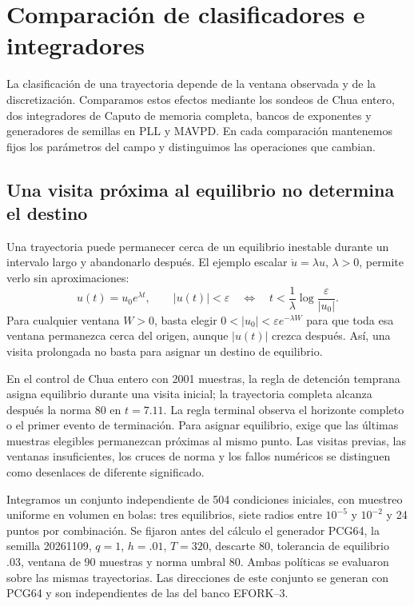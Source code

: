 \section{Comparación de clasificadores e integradores}
\label{sec:correcciones-noviembre}

La clasificación de una trayectoria depende de la ventana observada y de la
discretización. Comparamos estos efectos mediante los sondeos de Chua
entero, dos integradores de Caputo de memoria completa, bancos de exponentes
y generadores de semillas en PLL y MAVPD. En cada comparación mantenemos
fijos los parámetros del campo y distinguimos las operaciones que cambian.

\subsection{Una visita próxima al equilibrio no determina el destino}

Una trayectoria puede permanecer cerca de un equilibrio inestable durante
un intervalo largo y abandonarlo después. El ejemplo escalar
\(\dot u=\lambda u\), \(\lambda>0\), permite verlo sin aproximaciones:
\[
 u(t)=u_0e^{\lambda t},\qquad
 |u(t)|<\varepsilon
 \quad\Longleftrightarrow\quad
 t<\frac1\lambda\log\frac{\varepsilon}{|u_0|}.
\]
Para cualquier ventana \(W>0\), basta elegir
\(0<|u_0|<\varepsilon e^{-\lambda W}\) para que toda esa ventana permanezca
cerca del origen, aunque \(|u(t)|\) crezca después. Así, una visita prolongada
no basta para asignar un destino de equilibrio.

En el control de Chua entero con 2001 muestras, la regla de detención
temprana asigna equilibrio durante una visita inicial; la trayectoria
completa alcanza después la norma 80 en \(t=7.11\). La regla terminal
observa el horizonte completo o el primer evento de terminación. Para
asignar equilibrio, exige que las últimas muestras elegibles permanezcan
próximas al mismo punto. Las visitas previas, las ventanas insuficientes,
los cruces de norma y los fallos numéricos se distinguen como desenlaces
de diferente significado.

Integramos un conjunto independiente de 504 condiciones iniciales,
con muestreo uniforme en volumen en bolas: tres equilibrios, siete radios
entre $10^{-5}$ y $10^{-2}$ y 24 puntos por combinación. Se fijaron antes
del cálculo el generador PCG64, la semilla 20261109, $q=1$, $h=.01$,
$T=320$, descarte 80, tolerancia de equilibrio .03, ventana de 90
muestras y norma umbral 80. Ambas políticas se evaluaron sobre las mismas
trayectorias. Las direcciones de este conjunto se generan con PCG64 y
son independientes de las del banco EFORK--3.

